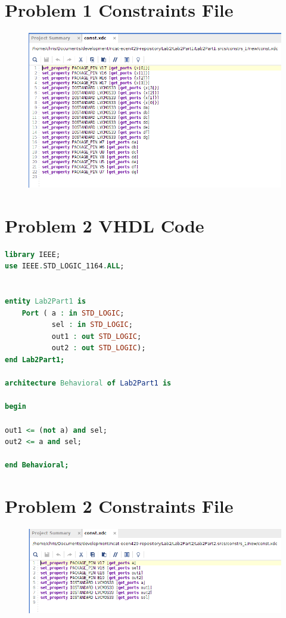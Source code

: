 \documentclass[11pt]{article}
\begin{document}
\begin{appendices}
	
	\section{Problem 1 Constraints File}
	
	\begin{figure}[h]
	\includegraphics[width=\textwidth]{report-images/img5}
	\end{figure}
	
	\section{Problem 2 VHDL Code}
	
	\begin{lstlisting}[language=VHDL]
library IEEE;
use IEEE.STD_LOGIC_1164.ALL;


entity Lab2Part1 is
    Port ( a : in STD_LOGIC;
           sel : in STD_LOGIC;
           out1 : out STD_LOGIC;
           out2 : out STD_LOGIC);
end Lab2Part1;

architecture Behavioral of Lab2Part1 is

begin

out1 <= (not a) and sel;
out2 <= a and sel;

end Behavioral;	
	\end{lstlisting}
	
	\section{Problem 2 Constraints File}
	
	\begin{figure}[h]
	\includegraphics[width=\textwidth]{report-images/img6}
	\end{figure}
	

\end{appendices}
\end{document}
